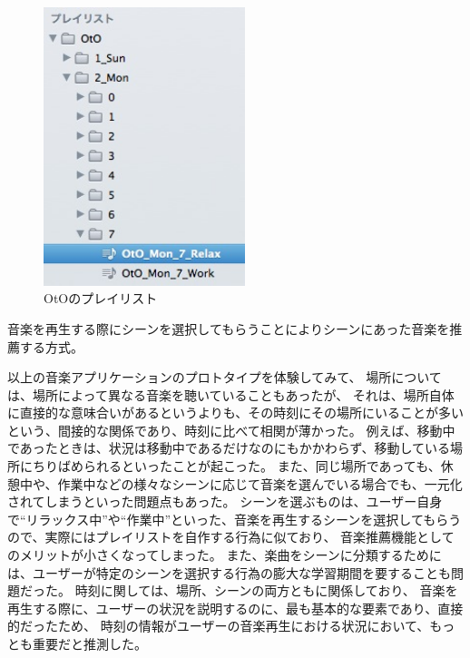 \documentclass[11pt, onecolumn]{jsarticle}
\begin{document}
\begin{enumerate}
\begin{figure}[h]
\begin{center}
\includegraphics[width=5.866cm]{OtO_playList.jpg}
\caption{OtOのプレイリスト}
\label{OtO_playlist}
\end{center}
\end{figure}


音楽を再生する際にシーンを選択してもらうことによりシーンにあった音楽を推薦する方式。
\end{enumerate}

以上の音楽アプリケーションのプロトタイプを体験してみて、
場所については、場所によって異なる音楽を聴いていることもあったが、
それは、場所自体に直接的な意味合いがあるというよりも、その時刻にその場所にいることが多いという、間接的な関係であり、時刻に比べて相関が薄かった。
例えば、移動中であったときは、状況は移動中であるだけなのにもかかわらず、移動している場所にちりばめられるといったことが起こった。
また、同じ場所であっても、休憩中や、作業中などの様々なシーンに応じて音楽を選んでいる場合でも、一元化されてしまうといった問題点もあった。
シーンを選ぶものは、ユーザー自身で``リラックス中''や``作業中''といった、音楽を再生するシーンを選択してもらうので、実際にはプレイリストを自作する行為に似ており、
音楽推薦機能としてのメリットが小さくなってしまった。
また、楽曲をシーンに分類するためには、ユーザーが特定のシーンを選択する行為の膨大な学習期間を要することも問題だった。
時刻に関しては、場所、シーンの両方ともに関係しており、
音楽を再生する際に、ユーザーの状況を説明するのに、最も基本的な要素であり、直接的だったため、
時刻の情報がユーザーの音楽再生における状況において、もっとも重要だと推測した。
\end{document}
